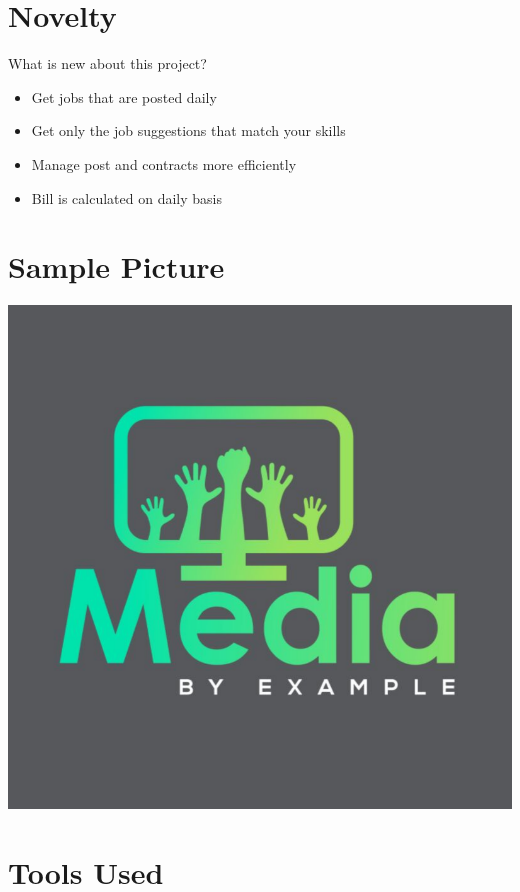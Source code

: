 \section{Novelty}

What is new about this project?

\begin{itemize}
\item Get jobs that are posted daily
\item Get only the job suggestions that match your skills
\item Manage post and contracts more efficiently
\item Bill is calculated on daily basis
\end{itemize}

\clearpage

\section{Sample Picture}
\includegraphics[scale=0.5]{Untitled+design+(2).png}

\clearpage

\section{Tools Used}

